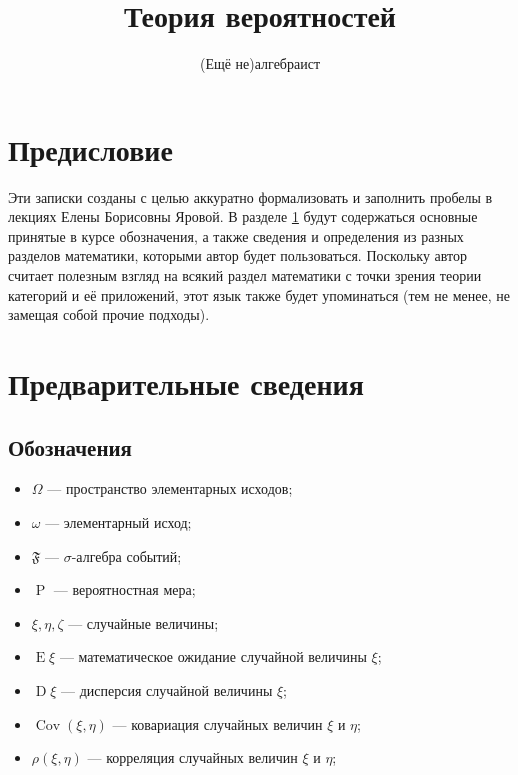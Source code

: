 \documentclass[12pt]{article}
\title{Теория вероятностей}
\author{(Ещё не)алгебраист}
\numberwithin{theorem}{section}
\numberwithin{proposition}{section}
\theoremstyle{definition}
\newcommand{\prob}{\operatorname{P}}
\newcommand{\events}{\mathfrak{F}}
\newcommand{\expect}{\operatorname{E}}
\newcommand{\disp}{\operatorname{D}}
\newcommand{\cov}{\operatorname{Cov}}
\begin{document}
	\maketitle
	
	\section*{Предисловие}
	
	Эти записки созданы с целью аккуратно формализовать и заполнить пробелы в лекциях Елены Борисовны Яровой.
	В разделе \ref{preparing} будут содержаться основные принятые в курсе обозначения, 
	а также сведения и определения из разных разделов математики, которыми автор будет пользоваться.
	Поскольку автор считает полезным взгляд на всякий раздел математики с точки зрения теории категорий и её приложений, 
	этот язык также будет упоминаться (тем не менее, не замещая собой прочие подходы).
	
	\tableofcontents
	
	
	\section{Предварительные сведения} \label{preparing}
	
	\subsection{Обозначения}
	
	
	\begin{itemize}
		\item $ \Omega $ --- пространство элементарных исходов;
		\item $ \omega $ --- элементарный исход;
		\item $ \events $ --- $ \sigma $-алгебра событий;
		\item $ \prob $ --- вероятностная мера;
		\item $ \xi, \eta, \zeta $ --- случайные величины;
		\item $ \expect \xi $ --- математическое ожидание случайной величины $ \xi $;
		\item $ \disp \xi $ --- дисперсия случайной величины $ \xi $;
		\item $ \cov(\xi, \eta) $ --- ковариация случайных величин $ \xi $ и $ \eta $;
		\item $ \rho(\xi, \eta) $ --- корреляция случайных величин $ \xi $ и $ \eta $;
	\end{itemize}
	
\end{document}
